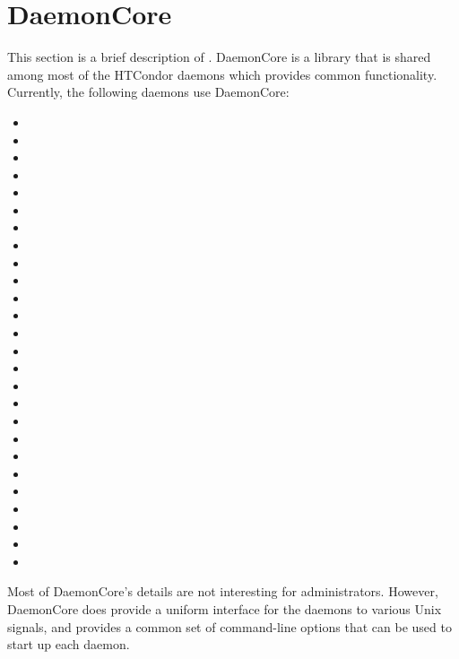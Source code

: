 
\section{\label{sec:DaemonCore}DaemonCore}

This section is a brief description of .  DaemonCore
is a library that is shared among most of the HTCondor daemons which
provides common functionality.  Currently, the following daemons use
DaemonCore:

\begin{itemize}
\item {}
\item {}
\item {}
\item {}
\item {}
\item {}
\item {}
\item {}
\item {}
\item {}
\item {}
\item {}
\item {}
\item {}
\item {}
\item {}
\item {}
\item {}
\item {}
\item {}
\item {}
\item {}
\item {}
\item {}
\item {}
\item {}
\end{itemize}

Most of DaemonCore's details are not interesting for administrators.
However, DaemonCore does provide a uniform interface for the daemons
to various Unix signals, and provides a common set of command-line
options that can be used to start up each daemon.

